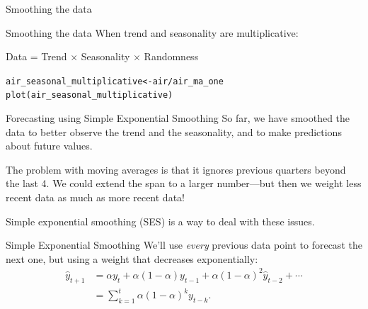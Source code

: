 \documentclass{beamer}\usepackage[]{graphicx}\usepackage[]{color}
\makeatletter
\newcommand{\hlopt}[1]{\textcolor[rgb]{1,0.894,0.769}{#1}}%
\newcommand{\hlstd}[1]{\textcolor[rgb]{1,0.894,0.769}{#1}}%
\newcommand{\hlkwb}[1]{\textcolor[rgb]{0.804,0.776,0.451}{#1}}%
\newcommand{\hlkwd}[1]{\textcolor[rgb]{1,0.78,0.769}{#1}}%
\newenvironment{kframe}{%
 \def\at@end@of@kframe{}%
 \ifinner\ifhmode%
  \def\at@end@of@kframe{\end{minipage}}%
  \begin{minipage}{\columnwidth}%
 \fi\fi%
 \def\FrameCommand##1{\hskip\@totalleftmargin \hskip-\fboxsep
 \colorbox{shadecolor}{##1}\hskip-\fboxsep
     \hskip-\linewidth \hskip-\@totalleftmargin \hskip\columnwidth}%
 \MakeFramed {\advance\hsize-\width
   \@totalleftmargin\z@ \linewidth\hsize
   \@setminipage}}%
 {\par\unskip\endMakeFramed%
 \at@end@of@kframe}
\newenvironment{knitrout}{}{} %
\makeatother
\begin{document}
\begin{darkframes}
\begin{frame}[fragile]{Smoothing the data}
\begin{knitrout}
\end{knitrout}
  
    \end{frame}
    
    
    \begin{frame}[fragile]{Smoothing the data}
      \fontsize{9}{9}\selectfont
        When trend and seasonality are multiplicative:
      \begin{center}
        Data = Trend $\times$ Seasonality $\times$ Randomness
      \end{center}
     
\begin{knitrout}
\begin{kframe}
\begin{alltt}
\hlstd{air_seasonal_multiplicative} \hlkwb{<-} \hlstd{air} \hlopt{/} \hlstd{air_ma_one}
\hlkwd{plot}\hlstd{(air_seasonal_multiplicative)}
\end{alltt}
\end{kframe}


\end{knitrout}
    \lc
    \end{frame}
    
    
    \begin{frame}[fragile]{Forecasting using Simple Exponential Smoothing}
        So far, we have smoothed the data to better observe the trend and the seasonality, and to make predictions about future values.
        \bigskip
        
        The problem with moving averages is that it ignores previous quarters beyond the last 4. We could extend the span to a larger number---but then we weight less recent data as much as more recent data!
        \bigskip

        Simple exponential smoothing (SES) is a way to deal with these issues.
    \end{frame}
    
    
    
    \begin{frame}[fragile]{Simple Exponential Smoothing}
      We'll use \emph{every} previous data point to forecast the next one, but using a weight that decreases exponentially:
      \begin{align*}
        \hat{y}_{t+1} &= \alpha y_t + \alpha (1-\alpha)y_{t-1} + \alpha (1-\alpha)^2 \hat{y}_{t-2} + \cdots \\
        &= \sum_{k=1}^t \alpha (1-\alpha)^k y_{t-k}.
      \end{align*}


\end{frame}
\end{darkframes}
\end{document}
